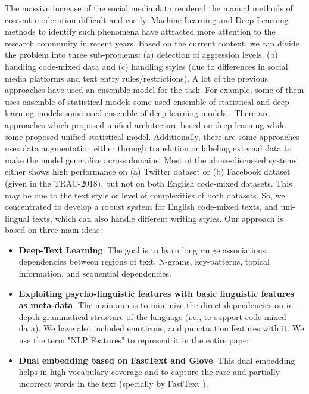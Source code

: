 \documentclass[sigconf]{acmart}
\begin{document}
\newline
The massive increase of the social media data rendered the manual methods of content moderation difficult and costly. Machine Learning and Deep Learning methods to identify such phenomena have attracted more attention to the research community in recent years\cite{kumar2018benchmarking}.
\newline
Based on the current context, we can divide the problem into three sub-problems: (a) detection of aggression levels, (b) handling code-mixed data and (c) handling styles (due to differences in social media platforms and text entry rules/restrictions).
\newline
A lot of the previous approaches\cite{kumar2018proceedings} have used an ensemble model for the task. For example, some of them uses ensemble of statistical models\cite{arroyo2018cyberbullying, fortuna2018merging, samghabadi2018ritual, orasan2018aggressive} some used ensemble of statistical and deep learning models\cite{risch2018aggression, tommasel2018textual, ramiandrisoa2018irit} some used  ensemble of deep learning models \cite{madisetty2018aggression}. There are approaches which proposed unified architecture based on deep learning\cite{aroyehun2018aggression, golem2018combining, orabi2018cyber, raiyani2018fully, nikhil2018lstms, galery2018aggression} while some proposed unified statistical model\cite{fortuna2018merging}. Additionally, there are some approaches uses data augmentation either through translation or labeling external data to make the model generalize across domains\cite{aroyehun2018aggression, risch2018aggression, fortuna2018merging}. 
\newline
Most of the above-discussed systems either shows high performance on (a) Twitter dataset or (b) Facebook dataset (given in the TRAC-2018), but not on both English code-mixed datasets. This may be due to the text style or level of complexities of both datasets. So, we concentrated to develop a robust system for English code-mixed texts, and uni-lingual texts, which can also handle different writing styles. Our approach is based on three main ideas: 
\begin{itemize}
	\item \textbf{Deep-Text Learning}. The goal is to learn long range associations, dependencies between regions of text, N-grams, key-patterns, topical information, and sequential dependencies.
	\item \textbf{Exploiting psycho-linguistic features with basic linguistic features as meta-data}. The main aim is to minimize the direct dependencies on in-depth grammatical structure of the language (i.e., to support code-mixed data). We have also included emoticons, and punctuation features with it. We use the term "NLP Features" to represent it in the entire paper.
	\item \textbf{Dual embedding based on FastText and Glove}. This dual embedding helps in high vocabulary coverage and to capture the rare and partially incorrect words in the text (specially by FastText \cite{mikolov2018advances}).  
\end{itemize}
\end{document}
